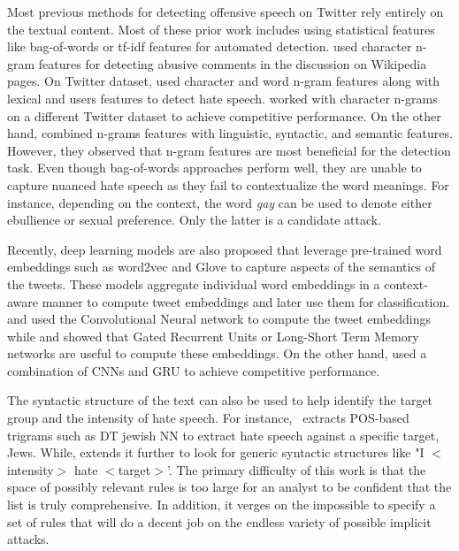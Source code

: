 Most previous methods for detecting offensive speech on Twitter rely entirely on the textual content.
Most of these prior work includes using statistical features like bag-of-words or tf-idf features for automated detection.\citet{wulczyn2017} used character n-gram features for detecting abusive comments in the discussion on Wikipedia pages. On Twitter dataset, \citet{waseem-hovy-2016} used character and word n-gram features along with lexical and users features to detect hate speech. \citet{davidson2017automated} worked with character n-grams on a different Twitter dataset to achieve competitive performance. On the other hand, \citet{nobata} combined n-grams features with linguistic, syntactic, and semantic features. However, they observed that n-gram features are most beneficial for the detection task.
Even though bag-of-words approaches perform well, they are unable to capture nuanced hate speech as they fail to contextualize the word meanings.
For instance, depending on the context, the word \emph{gay} can be used to denote either ebullience or sexual preference. Only the latter is a candidate attack.

Recently, deep learning models are also proposed that leverage pre-trained word embeddings such as word2vec \cite{mikolov2013distributed} and Glove \cite{glove}
to capture aspects of the semantics of the tweets. These models aggregate individual word embeddings in a context-aware manner to compute tweet embeddings and later use them for classification.
\citet{gamback} and \citet{park2017one} used the Convolutional Neural network to compute the tweet embeddings while \citet{badjatiya2017deep} and \citet{agrawal} showed that Gated Recurrent Units or Long-Short Term Memory networks are useful to compute these embeddings.
On the other hand, \citet{ziqicnn} used a combination of CNNs and GRU to achieve competitive performance.

The syntactic structure of the text can also be used to help identify the target group and the intensity of hate speech. For instance,~\citet{warner2012} extracts POS-based trigrams such as DT jewish NN to extract hate speech against a specific target, Jews. While, \citet{silva2016} extends it further to look for generic syntactic structures like "I $<$intensity$>$ hate $<$target$>$'.
The primary difficulty of this work is that the space of possibly relevant rules is too large for an analyst to be confident that the list is truly comprehensive.
In addition, it verges on the impossible to specify a set of rules that will do a decent job on the endless variety of possible implicit attacks.

